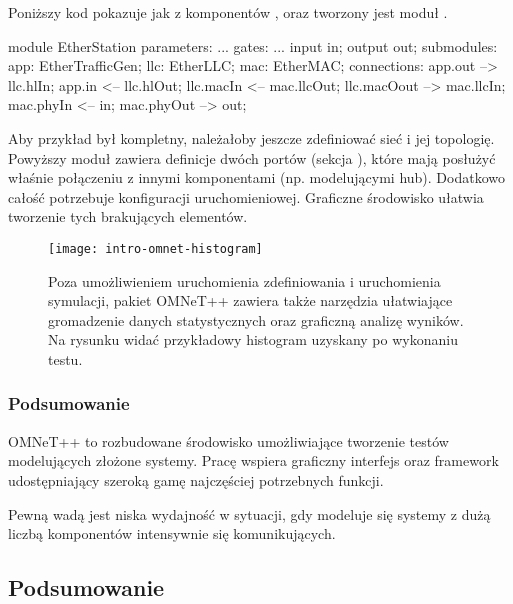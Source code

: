 \documentclass[00-praca-magisterska.tex]{subfiles}
\begin{document}
Poniższy kod pokazuje jak z komponentów , 
oraz  tworzony jest moduł .

\begin{textcode}
  module EtherStation {
      parameters: ...
      gates: ...
          input in;
          output out;  
      submodules:
          app: EtherTrafficGen;
          llc: EtherLLC;
          mac: EtherMAC;
      connections:
          app.out --> llc.hlIn;
          app.in <-- llc.hlOut;
          llc.macIn <-- mac.llcOut;
          llc.macOout --> mac.llcIn;
          mac.phyIn <-- in;
          mac.phyOut --> out;
  }
\end{textcode}

Aby przykład był kompletny, należałoby jeszcze zdefiniować sieć i jej
topologię.  Powyższy moduł zawiera definicje dwóch portów (sekcja
), które mają posłużyć właśnie połączeniu z innymi komponentami
(np. modelującymi hub). Dodatkowo całość potrzebuje konfiguracji
uruchomieniowej. Graficzne środowisko ułatwia tworzenie tych brakujących elementów.

\begin{figure}
\begin{center}
\leavevmode
\texttt{[image: intro-omnet-histogram]}
\end{center}
\caption{Poza umożliwieniem uruchomienia zdefiniowania i uruchomienia
symulacji, pakiet OMNeT++ zawiera także narzędzia ułatwiające gromadzenie
danych statystycznych oraz graficzną analizę wyników. Na rysunku widać
przykładowy histogram uzyskany po wykonaniu testu.}
\label{fig:intro-omnet-histogram}
\end{figure}

\subsubsection{Podsumowanie}

OMNeT++ to rozbudowane środowisko umożliwiające tworzenie testów modelujących
złożone systemy. Pracę wspiera graficzny interfejs oraz framework
udostępniający szeroką gamę najczęściej potrzebnych funkcji.

Pewną wadą jest niska wydajność w sytuacji, gdy modeluje się systemy z dużą
liczbą komponentów intensywnie się komunikujących.

\subsection{Podsumowanie}
\end{document}
